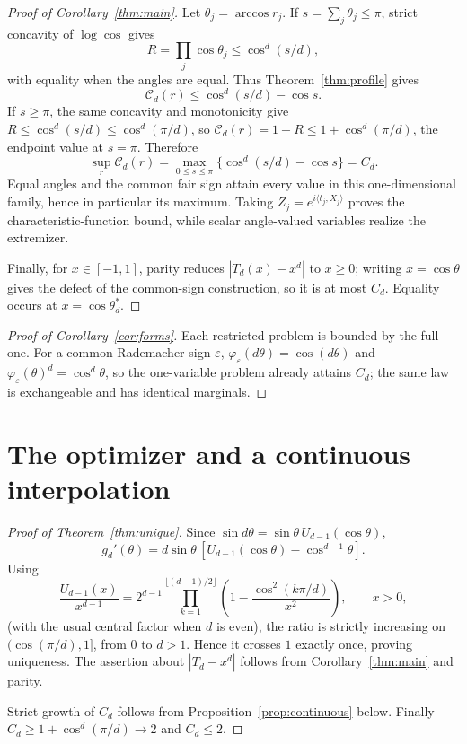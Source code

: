 \documentclass[11pt]{article}
\theoremstyle{definition}\newtheorem{definition}[theorem]{Definition}
\theoremstyle{remark}\newtheorem{remark}[theorem]{Remark}
\begin{document}
\begin{proof}[Proof of Corollary~\ref{thm:main}]
Let $\theta_j=\arccos r_j$. If $s=\sum_j\theta_j\le\pi$, strict concavity of $\log\cos$ gives
\[
R=\prod_j\cos\theta_j\le\cos^d(s/d),
\]
with equality when the angles are equal. Thus Theorem~\ref{thm:profile} gives
\[
\mathcal C_d(r)\le\cos^d(s/d)-\cos s.
\]
If $s\ge\pi$, the same concavity and monotonicity give
$R\le\cos^d(s/d)\le\cos^d(\pi/d)$, so
$\mathcal C_d(r)=1+R\le1+\cos^d(\pi/d)$, the endpoint value at $s=\pi$. Therefore
\[
\sup_r\mathcal C_d(r)=\max_{0\le s\le\pi}\{\cos^d(s/d)-\cos s\}=C_d.
\]
Equal angles and the common fair sign attain every value in this one-dimensional family, hence in particular its
maximum. Taking $Z_j=e^{i\langle t_j,X_j\rangle}$ proves the characteristic-function bound, while scalar angle-valued
variables realize the extremizer.

Finally, for $x\in[-1,1]$, parity reduces $|T_d(x)-x^d|$ to $x\ge0$; writing $x=\cos\theta$ gives the defect of the
common-sign construction, so it is at most $C_d$. Equality occurs at $x=\cos\theta_d^*$.
\end{proof}

\begin{proof}[Proof of Corollary~\ref{cor:forms}]
Each restricted problem is bounded by the full one. For a common Rademacher sign $\varepsilon$,
$\varphi_\varepsilon(d\theta)=\cos(d\theta)$ and $\varphi_\varepsilon(\theta)^d=\cos^d\theta$, so the one-variable problem
already attains $C_d$; the same law is exchangeable and has identical marginals.
\end{proof}

\section{The optimizer and a continuous interpolation}
\begin{proof}[Proof of Theorem~\ref{thm:unique}]
Since $\sin d\theta=\sin\theta\,U_{d-1}(\cos\theta)$,
\[
g_d'(\theta)=d\sin\theta\,[U_{d-1}(\cos\theta)-\cos^{d-1}\theta].
\]
Using
\[
\frac{U_{d-1}(x)}{x^{d-1}}=2^{d-1}\prod_{k=1}^{\lfloor(d-1)/2\rfloor}
\left(1-\frac{\cos^2(k\pi/d)}{x^2}\right),\qquad x>0,
\]
(with the usual central factor when $d$ is even), the ratio is strictly increasing on
$(\cos(\pi/d),1]$, from $0$ to $d>1$. Hence it crosses $1$ exactly once, proving uniqueness.
The assertion about $|T_d-x^d|$ follows from Corollary~\ref{thm:main} and parity.

Strict growth of $C_d$ follows from Proposition~\ref{prop:continuous} below. Finally
$C_d\ge1+\cos^d(\pi/d)\to2$ and $C_d\le2$.
\end{proof}
\end{document}
